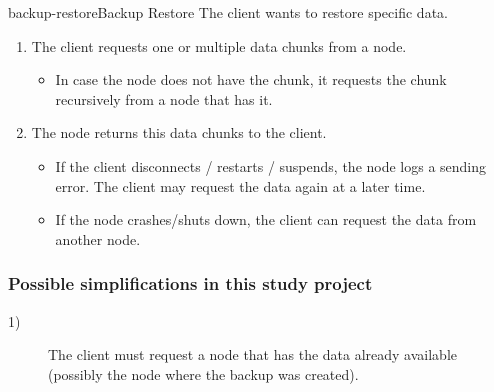 \begin{scenario}{backup-restore}{Backup Restore}
	The client wants to restore specific data.
	
	\begin{enumerate}
		\item The client requests one or multiple data chunks from a node.
			\begin{itemize}
				\item In case the node does not have the chunk, it requests the chunk recursively from a node that has it. %
			\end{itemize}
		\item The node returns this data chunks to the client.
			\begin{itemize}
				\item If the client disconnects / restarts / suspends, the node logs a sending error. The client may request the data again at a later time.
				\item If the node crashes/shuts down, the client can request the data from another node.
			\end{itemize}
	\end{enumerate}
    
	\subsubsection{Possible simplifications in this study project}
	\begin{description}
	 	\item[1)] The client must request a node that has the data already available (possibly the node where the backup was created).
	\end{description}
\end{scenario}


